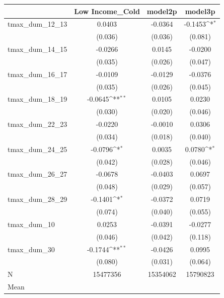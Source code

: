 {
\def\sym#1{\ifmmode^{#1}\else\(^{#1}\)\fi}
\begin{tabular}{l*{3}{c}}
\toprule
            &\multicolumn{1}{c}{Low Income\_Cold}&\multicolumn{1}{c}{model2p}&\multicolumn{1}{c}{model3p}\\
\midrule
tmax\_dum\_12\_13&      0.0403         &     -0.0364         &     -0.1453\sym{*}  \\
            &     (0.036)         &     (0.036)         &     (0.081)         \\
tmax\_dum\_14\_15&     -0.0266         &      0.0145         &     -0.0200         \\
            &     (0.035)         &     (0.026)         &     (0.047)         \\
tmax\_dum\_16\_17&     -0.0109         &     -0.0129         &     -0.0376         \\
            &     (0.035)         &     (0.026)         &     (0.045)         \\
tmax\_dum\_18\_19&     -0.0645\sym{**} &      0.0105         &      0.0230         \\
            &     (0.030)         &     (0.020)         &     (0.046)         \\
tmax\_dum\_22\_23&     -0.0220         &     -0.0010         &      0.0306         \\
            &     (0.034)         &     (0.018)         &     (0.040)         \\
tmax\_dum\_24\_25&     -0.0796\sym{*}  &      0.0035         &      0.0780\sym{*}  \\
            &     (0.042)         &     (0.028)         &     (0.046)         \\
tmax\_dum\_26\_27&     -0.0678         &     -0.0403         &      0.0697         \\
            &     (0.048)         &     (0.029)         &     (0.057)         \\
tmax\_dum\_28\_29&     -0.1401\sym{*}  &     -0.0372         &      0.0719         \\
            &     (0.074)         &     (0.040)         &     (0.055)         \\
tmax\_dum\_10 &      0.0253         &     -0.0391         &     -0.0277         \\
            &     (0.046)         &     (0.042)         &     (0.118)         \\
tmax\_dum\_30 &     -0.1744\sym{**} &     -0.0426         &      0.0995         \\
            &     (0.080)         &     (0.031)         &     (0.064)         \\
\midrule
N           &    15477356         &    15354062         &    15790823         \\
Mean        &                     &                     &                     \\
\bottomrule
\end{tabular}
}
